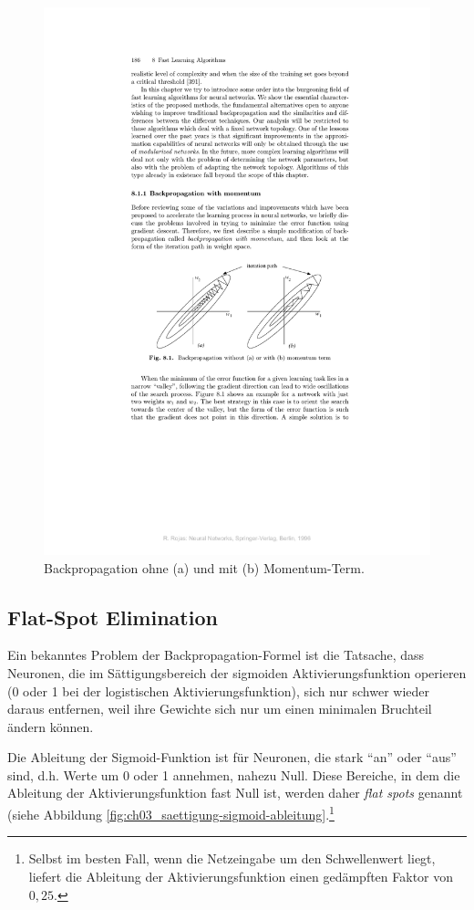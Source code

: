 \begin{figure}[ht!] \centering 
	\includegraphics[width=\linewidth]{figures/ch03_momentum-term.pdf}
	\caption{Backpropagation ohne (a) und mit (b) Momentum-Term.}
	\label{fig:ch03_momentum-term}
\end{figure}

\subsection*{Flat-Spot Elimination}
Ein bekanntes Problem der Backpropagation-Formel ist die Tatsache, dass Neuronen, die im Sättigungsbereich der sigmoiden Aktivierungsfunktion operieren (0 oder 1 bei der logistischen Aktivierungsfunktion), sich nur schwer wieder daraus entfernen, weil ihre Gewichte sich nur um einen minimalen Bruchteil ändern können.

Die Ableitung der Sigmoid-Funktion ist für Neuronen, die stark "`an"' oder "`aus"' sind, d.h. Werte um 0 oder 1 annehmen, nahezu Null. Diese Bereiche, in dem die Ableitung der Aktivierungsfunktion fast Null ist, werden daher \emph{flat spots} genannt (siehe Abbildung \ref{fig:ch03_saettigung-sigmoid-ableitung}.\footnote{Selbst im besten Fall, wenn die Netzeingabe um den Schwellenwert liegt, liefert die Ableitung der Aktivierungsfunktion einen gedämpften Faktor von $0,25$.}

